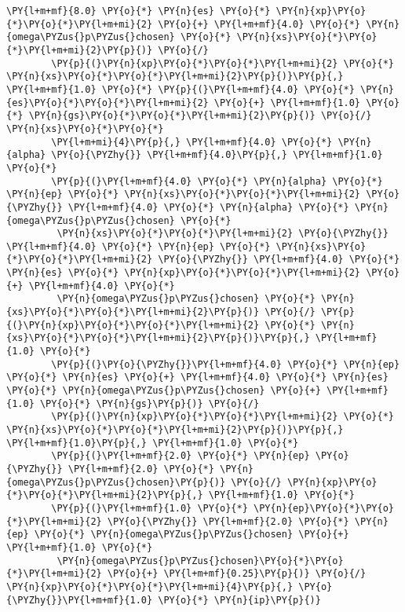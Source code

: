 \begin{Verbatim}[commandchars=\\\{\}]
         \PY{l+m+mf}{8.0} \PY{o}{*} \PY{n}{es} \PY{o}{*} \PY{n}{xp}\PY{o}{*}\PY{o}{*}\PY{l+m+mi}{2} \PY{o}{+} \PY{l+m+mf}{4.0} \PY{o}{*} \PY{n}{omega\PYZus{}p\PYZus{}chosen} \PY{o}{*} \PY{n}{xs}\PY{o}{*}\PY{o}{*}\PY{l+m+mi}{2}\PY{p}{)} \PY{o}{/}
        \PY{p}{(}\PY{n}{xp}\PY{o}{*}\PY{o}{*}\PY{l+m+mi}{2} \PY{o}{*} \PY{n}{xs}\PY{o}{*}\PY{o}{*}\PY{l+m+mi}{2}\PY{p}{)}\PY{p}{,} \PY{l+m+mf}{1.0} \PY{o}{*} \PY{p}{(}\PY{l+m+mf}{4.0} \PY{o}{*} \PY{n}{es}\PY{o}{*}\PY{o}{*}\PY{l+m+mi}{2} \PY{o}{+} \PY{l+m+mf}{1.0} \PY{o}{*} \PY{n}{gs}\PY{o}{*}\PY{o}{*}\PY{l+m+mi}{2}\PY{p}{)} \PY{o}{/} \PY{n}{xs}\PY{o}{*}\PY{o}{*}
        \PY{l+m+mi}{4}\PY{p}{,} \PY{l+m+mf}{4.0} \PY{o}{*} \PY{n}{alpha} \PY{o}{\PYZhy{}} \PY{l+m+mf}{4.0}\PY{p}{,} \PY{l+m+mf}{1.0} \PY{o}{*}
        \PY{p}{(}\PY{l+m+mf}{4.0} \PY{o}{*} \PY{n}{alpha} \PY{o}{*} \PY{n}{ep} \PY{o}{*} \PY{n}{xs}\PY{o}{*}\PY{o}{*}\PY{l+m+mi}{2} \PY{o}{\PYZhy{}} \PY{l+m+mf}{4.0} \PY{o}{*} \PY{n}{alpha} \PY{o}{*} \PY{n}{omega\PYZus{}p\PYZus{}chosen} \PY{o}{*}
         \PY{n}{xs}\PY{o}{*}\PY{o}{*}\PY{l+m+mi}{2} \PY{o}{\PYZhy{}} \PY{l+m+mf}{4.0} \PY{o}{*} \PY{n}{ep} \PY{o}{*} \PY{n}{xs}\PY{o}{*}\PY{o}{*}\PY{l+m+mi}{2} \PY{o}{\PYZhy{}} \PY{l+m+mf}{4.0} \PY{o}{*} \PY{n}{es} \PY{o}{*} \PY{n}{xp}\PY{o}{*}\PY{o}{*}\PY{l+m+mi}{2} \PY{o}{+} \PY{l+m+mf}{4.0} \PY{o}{*}
         \PY{n}{omega\PYZus{}p\PYZus{}chosen} \PY{o}{*} \PY{n}{xs}\PY{o}{*}\PY{o}{*}\PY{l+m+mi}{2}\PY{p}{)} \PY{o}{/} \PY{p}{(}\PY{n}{xp}\PY{o}{*}\PY{o}{*}\PY{l+m+mi}{2} \PY{o}{*} \PY{n}{xs}\PY{o}{*}\PY{o}{*}\PY{l+m+mi}{2}\PY{p}{)}\PY{p}{,} \PY{l+m+mf}{1.0} \PY{o}{*}
        \PY{p}{(}\PY{o}{\PYZhy{}}\PY{l+m+mf}{4.0} \PY{o}{*} \PY{n}{ep} \PY{o}{*} \PY{n}{es} \PY{o}{+} \PY{l+m+mf}{4.0} \PY{o}{*} \PY{n}{es} \PY{o}{*} \PY{n}{omega\PYZus{}p\PYZus{}chosen} \PY{o}{+} \PY{l+m+mf}{1.0} \PY{o}{*} \PY{n}{gs}\PY{p}{)} \PY{o}{/}
        \PY{p}{(}\PY{n}{xp}\PY{o}{*}\PY{o}{*}\PY{l+m+mi}{2} \PY{o}{*} \PY{n}{xs}\PY{o}{*}\PY{o}{*}\PY{l+m+mi}{2}\PY{p}{)}\PY{p}{,} \PY{l+m+mf}{1.0}\PY{p}{,} \PY{l+m+mf}{1.0} \PY{o}{*}
        \PY{p}{(}\PY{l+m+mf}{2.0} \PY{o}{*} \PY{n}{ep} \PY{o}{\PYZhy{}} \PY{l+m+mf}{2.0} \PY{o}{*} \PY{n}{omega\PYZus{}p\PYZus{}chosen}\PY{p}{)} \PY{o}{/} \PY{n}{xp}\PY{o}{*}\PY{o}{*}\PY{l+m+mi}{2}\PY{p}{,} \PY{l+m+mf}{1.0} \PY{o}{*}
        \PY{p}{(}\PY{l+m+mf}{1.0} \PY{o}{*} \PY{n}{ep}\PY{o}{*}\PY{o}{*}\PY{l+m+mi}{2} \PY{o}{\PYZhy{}} \PY{l+m+mf}{2.0} \PY{o}{*} \PY{n}{ep} \PY{o}{*} \PY{n}{omega\PYZus{}p\PYZus{}chosen} \PY{o}{+} \PY{l+m+mf}{1.0} \PY{o}{*}
         \PY{n}{omega\PYZus{}p\PYZus{}chosen}\PY{o}{*}\PY{o}{*}\PY{l+m+mi}{2} \PY{o}{+} \PY{l+m+mf}{0.25}\PY{p}{)} \PY{o}{/} \PY{n}{xp}\PY{o}{*}\PY{o}{*}\PY{l+m+mi}{4}\PY{p}{,} \PY{o}{\PYZhy{}}\PY{l+m+mf}{1.0} \PY{o}{*} \PY{n}{ip}\PY{p}{)}

\end{Verbatim}
